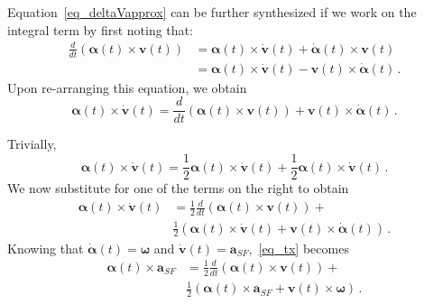 \documentclass[journal]{IEEEtran}
\begin{document}
Equation~\eqref{eq_deltaVapprox} can be further synthesized if we work on the integral term by first noting that:
\begin{equation}\label{eq_y}
\begin{split}
     \frac{d}{dt}\left(\boldsymbol{\alpha}(t)\times {\boldsymbol{v}}(t)\right)&= \boldsymbol{\alpha}(t)\times \dot{\boldsymbol{v}}(t) +\dot{\boldsymbol{\alpha}}(t)\times {\boldsymbol{v}}(t)\\
     &= \boldsymbol{\alpha}(t)\times \dot{\boldsymbol{v}}(t) - {\boldsymbol{v}}(t)\times \dot{\boldsymbol{\alpha}}(t)\,.
     \end{split}
\end{equation}
Upon re-arranging this equation, we obtain
\begin{equation}\label{eq_tt}
   \boldsymbol{\alpha}(t)\times \dot{\boldsymbol{v}}(t) = \frac{d}{dt}\left(\boldsymbol{\alpha}(t)\times \boldsymbol{v}(t)\right) + \boldsymbol{v}(t)\times \dot{\boldsymbol{\alpha}}(t)\,.
\end{equation}

Trivially,
\begin{equation}\label{eq_ty}
   \boldsymbol{\alpha}(t)\times \dot{\boldsymbol{v}}(t) =  \frac{1}{2}\boldsymbol{\alpha}(t)\times \dot{\boldsymbol{v}}(t) + \frac{1}{2} \boldsymbol{\alpha}(t)\times \dot{\boldsymbol{v}}(t)\,.
\end{equation}
We now substitute for one of the terms on the right to obtain
\begin{equation}\label{eq_tx}
\begin{split}
   \boldsymbol{\alpha}(t)\times \dot{\boldsymbol{v}}(t) &=  \frac{1}{2}\frac{d}{dt}\left(\boldsymbol{\alpha}(t)\times \boldsymbol{v}(t)\right) + \\
   &\frac{1}{2} \left(\boldsymbol{\alpha}(t)\times \dot{\boldsymbol{v}}(t)+
   \boldsymbol{v}(t)\times \dot{\boldsymbol{\alpha}}(t)\right)\,.
   \end{split}
\end{equation}
Knowing that $\dot{\boldsymbol{\alpha}}(t) = \boldsymbol\omega$ and $\dot{\boldsymbol{v}}(t)= \boldsymbol{a}_{SF}$,~\eqref{eq_tx} becomes
\begin{equation}\label{eq_ty}
\begin{split}
   \boldsymbol{\alpha}(t)\times\boldsymbol{a}_{SF} &=  \frac{1}{2}\frac{d}{dt}\left(\boldsymbol{\alpha}(t)\times \boldsymbol{v}(t)\right) + \\
   &\frac{1}{2} \left(\boldsymbol{\alpha}(t)\times \boldsymbol{a}_{SF} +\boldsymbol{v}(t)\times \boldsymbol{\omega}\right)\,.
   \end{split}
\end{equation}
\end{document}
